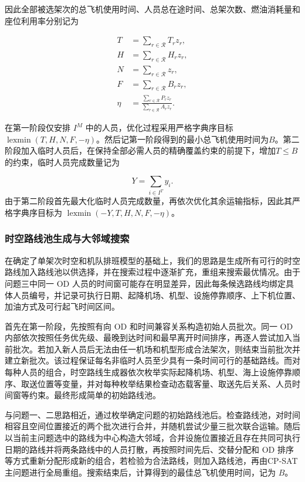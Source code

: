 \documentclass[UTF-8,a4paper,zihao=-4]{ctexart}
\begin{document}
因此全部被选架次的总飞机使用时间、人员总在途时间、总架次数、燃油消耗量和座位利用率分别记为

\begin{equation}
\begin{aligned}
T&=\sum_{r\in\mathcal{R}}T_rz_r,\\
H&=\sum_{r\in\mathcal{R}}H_rz_r,\\
N&=\sum_{r\in\mathcal{R}}z_r,\\
F&=\sum_{r\in\mathcal{R}}B_rz_r,\\
\eta
&=
\frac{\displaystyle\sum_{r\in\mathcal{R}}P_rz_r}
{\displaystyle\sum_{r\in\mathcal{R}}A_rz_r}.
\end{aligned}
\end{equation}

在第一阶段仅安排 $I^{M}$ 中的人员，优化过程采用严格字典序目标 $\operatorname{lexmin}(T,H,N,F,-\eta)$。然后记第一阶段得到的最小总飞机使用时间为$B$。第二阶段加入临时人员后，在保持全部必需人员的精确覆盖约束的前提下，增加$T\leq B$的约束，临时人员完成数量记为

\begin{equation}
Y=\sum_{i\in I^{T}}y_i.
\end{equation}
由于第二阶段首先最大化临时人员完成数量，再依次优化其余运输指标，因此其严格字典序目标为 $\operatorname{lexmin}(-Y,T,H,N,F,-\eta)$。

\subsubsection{时空路线池生成与大邻域搜索}

在确定了单架次时空和机队排班模型的基础上，我们的思路是生成所有可行的时空路线加入路线池以供选择，并在搜索过程中逐渐扩充，重组来搜索最优情况。由于问题三中同一 OD 人员的时间窗可能存在明显差异，因此每条候选路线均绑定具体人员编号，并记录可执行日期、起降机场、机型、设施停靠顺序、上下机位置、加油方式及可行起飞时间区间。

首先在第一阶段，先按照有向 OD 和时间兼容关系构造初始人员批次。同一 OD 内部依次按照任务优先级、最晚到达时间和最早离开时间排序，再逐人尝试加入当前批次。若加入新人员后无法由任一机场和机型形成合法架次，则结束当前批次并建立新批次。该过程保证每名非临时人员至少具有一条时间可行的基础路线。而对每种人员的组合，时空路线生成器依次枚举实际起降机场、机型、海上设施停靠顺序、取送位置等变量，并对每种枚举结果检查动态载客量、取送先后关系、人员时间窗等约束。最终形成简单的初始路线池。

与问题一、二思路相近，通过枚举确定问题的初始路线池后。检查路线池，对时间相容且空间位置接近的两个批次进行合并，并随机尝试少量三批次联合运输。随后以当前主问题选中的路线为中心构造大邻域，合并设施位置接近且存在共同可执行日期的路线并将两条路线中的人员打散，再按照时间先后、交替分配和 OD 排序等方式重新分配形成新的组合，若检验为合法路线，则加入路线池，再由CP-SAT主问题进行全局重组。搜索结束后，计算得到的最佳总飞机使用时间，记为 $B$。
\end{document}
